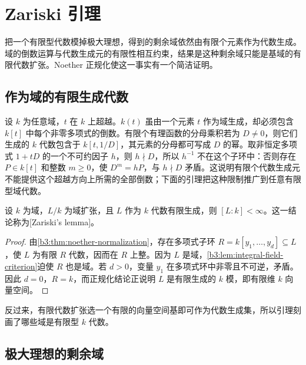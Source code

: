
\section{Zariski 引理}\label{b3:sec:0601}

把一个有限型代数模掉极大理想，得到的剩余域依然由有限个元素作为代数生成。域的倒数运算与代数生成元的有限性相互约束，结果是这种剩余域只能是基域的有限代数扩张。Noether 正规化使这一事实有一个简洁证明。

\subsection{作为域的有限生成代数}\label{b3:subsec:0601:01}

设 \(k\) 为任意域，\(t\) 在 \(k\) 上超越。\(k(t)\) 虽由一个元素 \(t\) 作为域生成，却必须包含 \(k[t]\) 中每个非零多项式的倒数。有限个有理函数的分母乘积若为 \(D\ne0\)，则它们生成的 \(k\) 代数包含于 \(k[t,1/D]\)，其元素的分母都可写成 \(D\) 的幂。取非恒定多项式 \(1+tD\) 的一个不可约因子 \(h\)，则 \(h\nmid D\)，所以 \(h^{-1}\) 不在这个子环中：否则存在 \(P\in k[t]\) 和整数 \(m\ge0\)，使 \(D^m=hP\)，与 \(h\nmid D\) 矛盾。这说明有限个代数生成元不能提供这个超越方向上所需的全部倒数；下面的引理把这种限制推广到任意有限型域代数。

\begin{lemma}[Zariski]\label{b3:lem:zariski}
	设 \(k\) 为域，\(L/k\) 为域扩张，且 \(L\) 作为 \(k\) 代数有限生成，则 \([L:k]<\infty\)。这一结论称为[Zariski's lemma]。
\end{lemma}
\begin{proof}
	由\cref{b3:thm:noether-normalization}，存在多项式子环 \(R=k[y_1,\ldots,y_d]\subseteq L\)，使 \(L\) 为有限 \(R\) 代数，因而在 \(R\) 上整。因为 \(L\) 是域，\cref{b3:lem:integral-field-criterion}迫使 \(R\) 也是域。若 \(d>0\)，变量 \(y_1\) 在多项式环中非零且不可逆，矛盾。因此 \(d=0\)，\(R=k\)，而正规化结论正说明 \(L\) 是有限生成的 \(k\) 模，即有限维 \(k\) 向量空间。
\end{proof}

反过来，有限代数扩张选一个有限的向量空间基即可作为代数生成集，所以引理刻画了哪些域是有限型 \(k\) 代数。

\subsection{极大理想的剩余域}\label{b3:subsec:0601:02}

